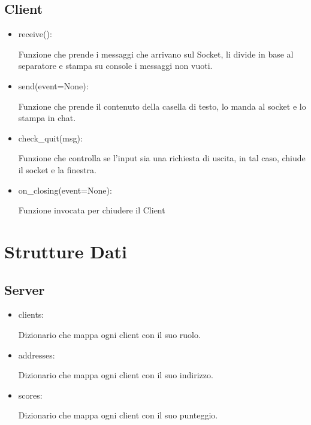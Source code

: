 \documentclass[a4paper,12pt]{report}
\begin{document}
\subsection{Client}
\begin{itemize}
	\item receive():
	
	Funzione che prende i messaggi che arrivano sul Socket, li divide in base al separatore
	e stampa su console i messaggi non vuoti.
	\item send(event=None):
	
	Funzione che prende il contenuto della casella di testo, lo manda al socket e lo stampa 
	in chat.
	\item check\_quit(msg):
	
	Funzione che controlla se l'input sia una richiesta di uscita, in tal caso, 
	chiude il socket e la finestra.
	\item on\_closing(event=None):
	
	Funzione invocata per chiudere il Client
\end{itemize}

\section{Strutture Dati}
\subsection{Server}
\begin{itemize}
	\item clients:
	
	Dizionario che mappa ogni client con il suo ruolo.
	\item addresses:
	
	Dizionario che mappa ogni client con il suo indirizzo.
	\item scores:
	
	Dizionario che mappa ogni client con il suo punteggio.
\end{itemize}
\end{document}

